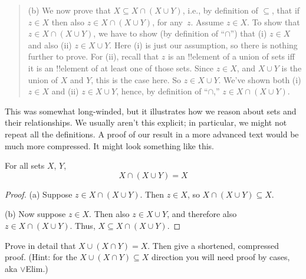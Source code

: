 \documentclass[../../../include/open-logic-section]{subfiles}
\begin{document}
\begin{explain}
\begin{quote}
(b) We now prove that $X \subseteq X \cap (X \cup Y)$, i.e., by
definition of $\subseteq$, that if $z \in X$ then also $z \in X \cap
(X \cup Y)$, for any~$z$. Assume $z \in X$. To show that $z \in X
\cap (X \cup Y)$, we have to show (by definition of ``$\cap$'') that
(i) $z \in X$ and also (ii) $z \in X \cup Y$. Here (i) is just our
assumption, so there is nothing further to prove. For (ii), recall that $z$
is an !!{element} of a union of sets iff it is an !!{element} of at least
one of those sets. Since $z \in X$, and $X \cup Y$ is the union of
$X$ and $Y$, this is the case here. So $z \in X \cup Y$. We've shown
both (i) $z \in X$ and (ii) $z \in X \cup Y$, hence, by definition of
``$\cap$,'' $z \in X \cap (X \cup Y)$.
\end{quote}

This was somewhat long-winded, but it illustrates how we reason about
sets and their relationships. We usually aren't this explicit; in
particular, we might not repeat all the definitions. A proof of our
result in a more advanced text would be much more compressed. It might
look something like this.
\end{explain}


\begin{prop}[Absorption]
For all sets $X$, $Y$,
\[
X \cap (X \cup Y) = X
\]
\end{prop}

\begin{proof}
(a) Suppose $z \in X \cap (X \cup Y)$. Then $z \in X$, so $X \cap (X
  \cup Y) \subseteq X$.

(b) Now suppose $z \in X$. Then also $z \in X \cup Y$, and therefore
  also $z \in X \cap (X \cup Y)$. Thus, $X \subseteq X \cap (X \cup
  Y)$.
\end{proof}

\begin{prob}
Prove in detail that $X \cup (X \cap Y) = X$. Then give a shortened,
compressed proof. (Hint: for the $X \cup (X \cap Y) \subseteq X$
direction you will need proof by cases, aka $\lor$Elim.)
\end{prob}
\end{document}
